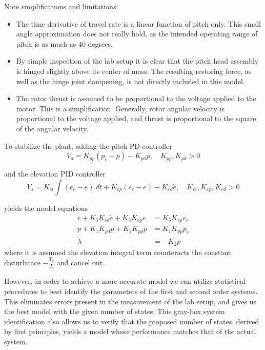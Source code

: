 Note simplifications and limitations:
\begin{itemize}
	\item{The time derivative of travel rate is a linear function of pitch only. This small angle approximation does not really hold, as the intended operating range of pitch is as much as $40$ degrees.}
	\item{By simple inspection of the lab setup it is clear that the pitch head assembly is hinged slightly above its center of mass. The resulting restoring force, as well as the hinge joint dampening, is not directly included in this model.}
	\item{The rotor thrust is assumed to be proportional to the voltage applied to the motor. This is a simplification. Generally, rotor angular velocity is proportional to the voltage applied, and thrust is proportional to the square of the angular velocity.}
\end{itemize}

To stabilize the plant, adding the pitch PD controller
\begin{equation*}
	V_d = K_{pp} (p_c - p) - K_{pd} \dot{p}, \quad K_{pp}, K_{pd} > 0
\end{equation*}

and the elevation PID controller
\begin{equation*}
	V_s = K_{ei} \int (e_c - e) \ dt +  K_{ep} (e_c - e) - K_{ed} \dot{e}, \quad K_{ei}, K_{ep}, K_{ed} > 0
\end{equation*}

yields the model equations
\begin{subequations}
\label{eq:model}
\begin{align}
	\ddot{e} + K_{3} K_{ed} \dot{e} + K_{3} K_{ep} e &= K_{3} K_{ep} e_{c} \label{eq:model_se_al_elev} \\
	\ddot{p} + K_{1} K_{pd} \dot{p} + K_{1} K_{pp} p &= K_{1} K_{pp} p_{c} \label{eq:model_se_al_pitch} \\
	\ddot{\lambda} &= -K_{2} p \label{eq:model_se_al_r} 
\end{align}
\end{subequations}
where it is assumed the elevation integral term counteracts the constant disturbance $-\frac{T_g}{J_e}$ and cancel out.

However, in order to achieve a more accurate model we can utilize statistical procedures to best identify the parameters of the first and second order systems. This eliminates errors present in the measurement of the lab setup, and gives us the best model with the given number of states. This gray-box system identification also allows us to verify that the proposed number of states, derived by first principles, yields a model whose performance matches that of the actual system.

